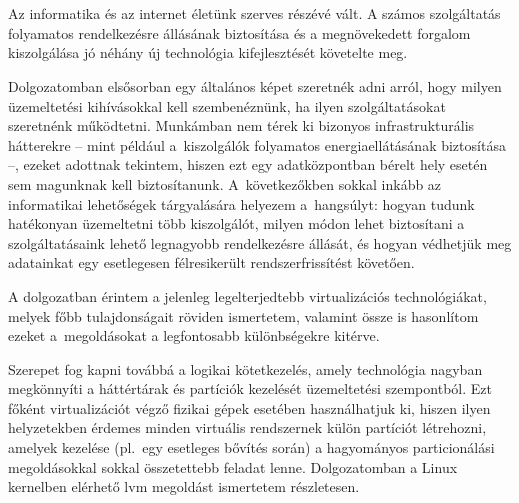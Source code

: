 \chapter{\bevezetes}

%

Az informatika és az internet életünk szerves részévé vált. A számos szolgáltatás folyamatos rendelkezésre állásának biztosítása és a megnövekedett forgalom kiszolgálása jó néhány új technológia kifejlesztését követelte meg.

Dolgozatomban elsősorban egy általános képet szeretnék adni arról, hogy milyen üzemeltetési kihívásokkal kell szembenéznünk, ha ilyen szolgáltatásokat szeretnénk működtetni. Munkámban nem térek ki bizonyos infrastrukturális hátterekre -- mint például a~kiszolgálók folyamatos energiaellátásának biztosítása --, ezeket adottnak tekintem, hiszen ezt egy adatközpontban bérelt hely esetén sem magunknak kell biztosítanunk. A~következőkben sokkal inkább az informatikai lehetőségek tárgyalására helyezem a~hangsúlyt: hogyan tudunk hatékonyan üzemeltetni több kiszolgálót, milyen módon lehet biztosítani a szolgáltatásaink lehető legnagyobb rendelkezésre állását, és hogyan védhetjük meg adatainkat egy esetlegesen félresikerült rendszerfrissítést követően.

A dolgozatban érintem a jelenleg legelterjedtebb virtualizációs technológiákat, melyek főbb tulajdonságait röviden ismertetem, valamint össze is hasonlítom ezeket a~megoldásokat a legfontosabb különbségekre kitérve.

Szerepet fog kapni továbbá a logikai kötetkezelés, amely technológia nagyban megkönnyíti a háttértárak és partíciók kezelését üzemeltetési szempontból. Ezt főként virtualizációt végző fizikai gépek esetében használhatjuk ki, hiszen ilyen helyzetekben érdemes minden virtuális rendszernek külön partíciót létrehozni, amelyek kezelése (pl.~egy esetleges bővítés során) a hagyományos particionálási megoldásokkal sokkal összetettebb feladat lenne. Dolgozatomban a Linux kernelben elérhető \acrfull{lvm} megoldást ismertetem részletesen. 

